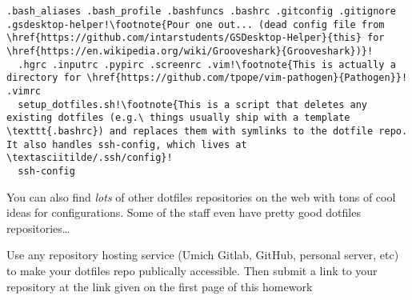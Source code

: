 \documentclass{article}
\begin{document}
\begin{lstlisting}[escapechar=!]
  .bash_aliases .bash_profile .bashfuncs .bashrc .gitconfig .gitignore .gsdesktop-helper!\footnote{Pour one out... (dead config file from \href{https://github.com/intarstudents/GSDesktop-Helper}{this} for \href{https://en.wikipedia.org/wiki/Grooveshark}{Grooveshark})}!
  .hgrc .inputrc .pypirc .screenrc .vim!\footnote{This is actually a directory for \href{https://github.com/tpope/vim-pathogen}{Pathogen}}!  .vimrc
  setup_dotfiles.sh!\footnote{This is a script that deletes any existing dotfiles (e.g.\ things usually ship with a template \texttt{.bashrc}) and replaces them with symlinks to the dotfile repo. It also handles ssh-config, which lives at \textasciitilde/.ssh/config}!
  ssh-config
\end{lstlisting}

You can also find \emph{lots} of other dotfiles repositories on the web with
tons of cool ideas for configurations. Some of the staff even have pretty good
dotfiles repositories\dots

Use any repository hosting service (Umich Gitlab, GitHub, personal server,
etc) to make your dotfiles repo publically accessible. Then submit a link to
your repository at the link given on the first page of this homework
\end{document}
